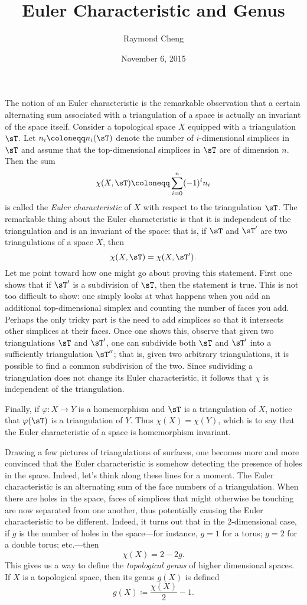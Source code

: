 \documentclass{axolotl}
\title{Euler Characteristic and Genus}
\author{Raymond Cheng}
\date{November 6, 2015}
\begin{document}
\maketitle
{}
The notion of an Euler characteristic is the remarkable observation that a
certain alternating sum associated with a triangulation of a space is actually
an invariant of the space itself. Consider a topological space \(X\) equipped
with a triangulation \(\sT\). Let \(n_i \coloneqq n_i(\sT)\) denote the number
of \(i\)-dimensional simplices in \(\sT\) and assume that the top-dimensional
simplices in \(\sT\) are of dimension \(n\). Then the sum
\[ \chi(X,\sT) \coloneqq \sum^n_{i = 0} (-1)^i n_i \]
is called the \emph{Euler characteristic} of \(X\) with respect to the
triangulation \(\sT\). The remarkable thing about the Euler characteristic is
that it is independent of the triangulation and is an invariant of the space:
that is, if \(\sT\) and \(\sT'\) are two triangulations of a space \(X\), then
\[ \chi(X,\sT) = \chi(X,\sT'). \]
Let me point toward how one might go about proving this statement. First one
shows that if \(\sT'\) is a subdivision of \(\sT\), then the statement is true.
This is not too difficult to show: one simply looks at what happens when you add
an additional top-dimensional simplex and counting the number of faces you add.
Perhaps the only tricky part is the need to add simplices so that it intersects
other simplices at their faces. Once one shows this, observe that given two
triangulations \(\sT\) and \(\sT'\), one can subdivide both \(\sT\) and
\(\sT'\) into a sufficiently triangulation \(\sT''\); that is, given two
arbitrary triangulations, it is possible to find a common subdivision of the
two. Since sudividing a triangulation does not change its Euler characteristic,
it follows that \(\chi\) is independent of the triangulation.

Finally, if \(\varphi: X \to Y\) is a homemorphism and \(\sT\) is a
triangulation of \(X\), notice that \(\varphi(\sT)\) is a triangulation of
\(Y\). Thus \(\chi(X) = \chi(Y)\), which is to say that the Euler
characteristic of a space is homemorphism invariant.

Drawing a few pictures of triangulations of surfaces, one becomes more and
more convinced that the Euler characteristic is somehow detecting the presence
of holes in the space. Indeed, let's think along these lines for a moment. The
Euler characteristic is an alternating sum of the face numbers of a
triangulation. When there are holes in the space, faces of simplices that might
otherwise be touching are now separated from one another, thus potentially
causing the Euler characteristic to be different. Indeed, it turns out that
in the \(2\)-dimensional case, if \(g\) is the number of holes in the space---for
instance, \(g = 1\) for a torus; \(g = 2\) for a double torus; etc.---then
\[ \chi(X) = 2 - 2g. \]
This gives us a way to define the \emph{topological genus} of higher dimensional
spaces. If \(X\) is a topological space, then its genus \(g(X)\) is defined
\[ g(X) \coloneqq \frac{\chi(X)}{2} - 1. \]
\end{document}
